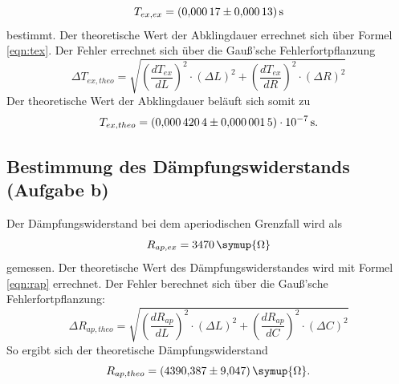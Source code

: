 \begin{equation*}
  T_{ex, ex}= \SI{0.00017 \pm 0.00013}{s}
\end{equation*}
bestimmt.
Der theoretische Wert der Abklingdauer errechnet sich über Formel \eqref{eqn:tex}.
Der Fehler errechnet sich über die Gauß'sche Fehlerfortpflanzung
\begin{equation*}
  \Delta T_{ex, theo}= \sqrt{ \left( \frac{d T_{ex}}{dL} \right)^2 \cdot (\Delta L)^2 + \left( \frac{d T_{ex}}{dR} \right)^2 \cdot (\Delta R)^2}
\end{equation*}
Der theoretische Wert der Abklingdauer beläuft sich somit zu
\begin{equation*}
  T_{ex, theo}= \SI{0.0004204 \pm 0.0000015e-7}{s}.
\end{equation*}
\FloatBarrier
\subsection{Bestimmung des Dämpfungswiderstands (Aufgabe b)}
Der Dämpfungswiderstand bei dem aperiodischen Grenzfall wird als
\begin{equation*}
  R_{ap, ex}= \SI{3470}{\symup{\Omega}}
\end{equation*}
gemessen.
Der theoretische Wert des Dämpfungswiderstandes wird mit Formel \eqref{eqn:rap} errechnet.
Der Fehler berechnet sich über die Gauß'sche Fehlerfortpflanzung:
\begin{equation*}
  \Delta R_{ap, theo} = \sqrt{ \left( \frac{d R_{ap}}{dL} \right)^2 \cdot (\Delta L)^2 + \left( \frac{d R_{ap}}{dC} \right)^2 \cdot (\Delta C)^2}
\end{equation*}
So ergibt sich der theoretische Dämpfungswiderstand
\begin{equation*}
  R_{ap, theo} = \SI{4390.387 \pm 9.047}{\symup{\Omega}}.
\end{equation*}

